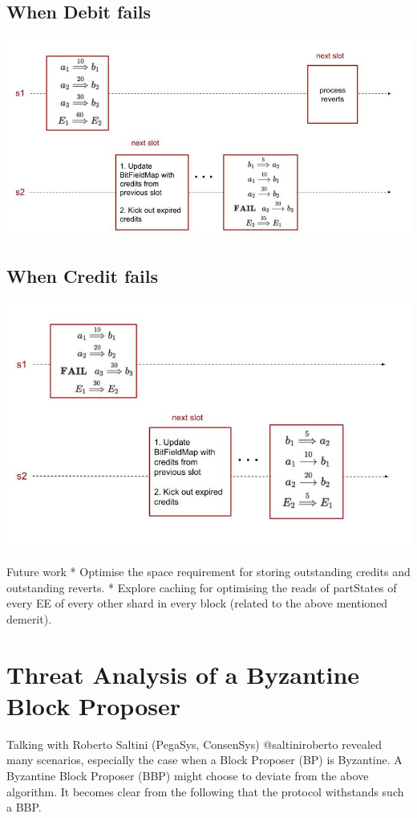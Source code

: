 \documentclass{article}
\begin{document}
\subsection{When Debit fails}
\includegraphics[scale=0.5]{Credit-2.jpg}
\subsection{When Credit fails}
\includegraphics[scale=0.5]{Debit.jpg}

Future work
* Optimise the space requirement for storing outstanding credits and outstanding reverts.
* Explore caching for optimising the reads of partStates of every EE of every other shard in every block (related to the above mentioned demerit).

\section{Threat Analysis of a Byzantine Block Proposer}
\label{sec:threat}
Talking with Roberto Saltini (PegaSys, ConsenSys) @saltiniroberto revealed many scenarios, especially the case when a Block Proposer (BP) is Byzantine. A Byzantine Block Proposer (BBP) might choose to deviate from the above algorithm. It becomes clear from the following that the protocol withstands such a BBP.
\end{document}
